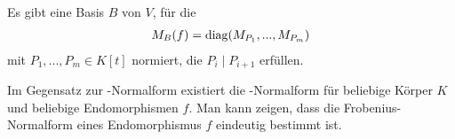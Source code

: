 \begin{conclusion}
	Es gibt eine Basis $B$ von $V$, für die 
	\begin{align}
		M_B(f)=\operatorname{diag}(M_{P_1},...,M_{P_m})\notag
	\end{align}
	mit $P_1,...,P_m\in K[t]$ normiert, die $P_i\mid P_{i+1}$ erfüllen.
\end{conclusion}

\begin{remark}
	Im Gegensatz zur -Normalform existiert die -Normalform für beliebige Körper $K$ und beliebige Endomorphismen $f$. Man kann zeigen, dass die Frobenius-Normalform eines Endomorphismus $f$ eindeutig bestimmt ist.
\end{remark}
